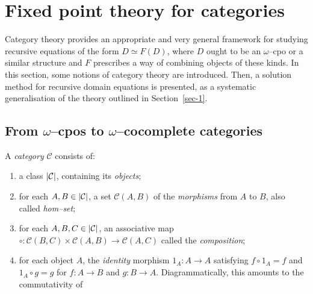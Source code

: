 \section{Fixed point theory for categories}\label{sec-2}

Category theory provides an appropriate and very general framework for studying
recursive equations of the form \(D \simeq F(D)\), where \(D\) ought to be an
\(\omega{}\)--cpo or a similar structure and \(F\) prescribes a way of
combining objects of these kinds.
In this section, some notions of category theory are introduced.
Then, a solution method for recursive domain equations is presented, as a
systematic generalisation of the theory outlined in Section~\ref{sec-1}.

\subsection{From \(\omega\)--cpos to \(\omega\)--cocomplete categories}%

\begin{dfn}
  A \emph{category} \(\mathcal{C}\) consists of:
  \begin{enumerate}
    \item a class \(\lvert \mathcal{C} \rvert\), containing its \emph{objects};
    \item for each \(A, B \in \lvert \mathcal{C} \rvert\),
    a set \(\mathcal{C}(A,B)\) of the \emph{morphisms} from \(A\) to \(B\), also called \emph{hom--set}; %
    \item for each \(A,B,C \in \lvert \mathcal{C} \rvert\), an associative map
    \(
      \circ \colon \mathcal{C}(B,C) \times \mathcal{C}(A,B) \to \mathcal{C}(A,C)
    \)
    called the \emph{composition};
    \item for each object \(A\), the \emph{identity} morphism \(1_A \colon A \to A\) satisfying \(f \circ 1_A = f\) and \(1_A \circ g = g\) for \(f \colon A \to B\) and \(g \colon B \to A\).
    Diagrammatically, this amounts to the commutativity of
    \begin{center}
    \end{center}
  \end{enumerate}
\end{dfn}

